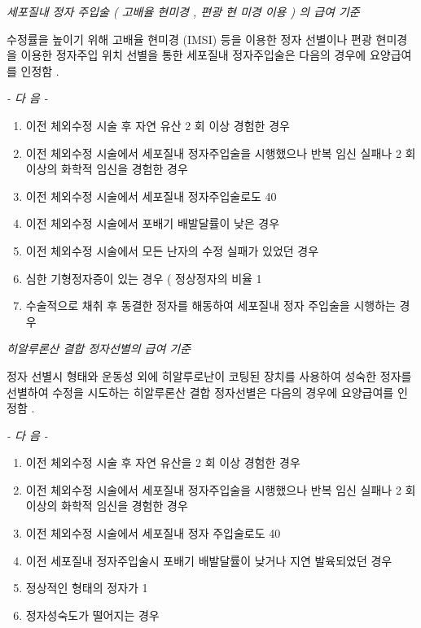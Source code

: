 {\emph{세포질내 정자 주입술 ( 고배율 현미경 ,  편광 현 미경 이용 ) 의  급여 기준 }\par
수정률을 높이기 위해 고배율 현미경 (IMSI)  등을 이용한 정자  선별이나 편광 현미경을 이용한 정자주입 위치 선별을 통한 세포질내 정자주입술은 다음의 경우에 요양급여를 인정함 . \par

\emph{-  다 음  -}\par 
\begin{enumerate}[가.]\tightlist
\item 이전 체외수정 시술 후 자연 유산  2 회 이상 경험한 경우 
\item 이전 체외수정 시술에서 세포질내 정자주입술을 시행했으나  반복 임신 실패나  2 회 이상의 화학적 임신을 경험한 경우 
\item 이전 체외수정 시술에서 세포질내 정자주입술로도  40%
\item 이전 체외수정 시술에서 포배기 배발달률이 낮은 경우 
\item 이전 체외수정 시술에서 모든 난자의 수정 실패가 있었던 경우 
\item 심한 기형정자증이 있는 경우 ( 정상정자의 비율  1%
\item 수술적으로 채취 후 동결한 정자를 해동하여 세포질내 정자 주입술을 시행하는 경우 
\end{enumerate} 

\emph{히알루론산 결합  정자선별의 급여 기준 }\par
정자 선별시 형태와 운동성 외에 히알루로난이 코팅된 장치를  사용하여 성숙한 정자를 선별하여 수정을 시도하는 히알루론산  결합 정자선별은 다음의 경우에 요양급여를 인정함 . \par

\emph{-  다 음  -}\par  
\begin{enumerate}[가.]\tightlist
\item 이전 체외수정 시술 후 자연 유산을  2 회 이상 경험한 경우 
\item 이전 체외수정 시술에서 세포질내 정자주입술을 시행했으나  반복 임신 실패나  2 회 이상의 화학적 임신을 경험한 경우  
\item 이전 체외수정 시술에서 세포질내 정자 주입술로도  40%
\item 이전  세포질내 정자주입술시  포배기 배발달률이 낮거나 지연 발육되었던 경우 
\item 정상적인 형태의 정자가  1%
\item 정자성숙도가 떨어지는 경우 
\end{enumerate} 

}
